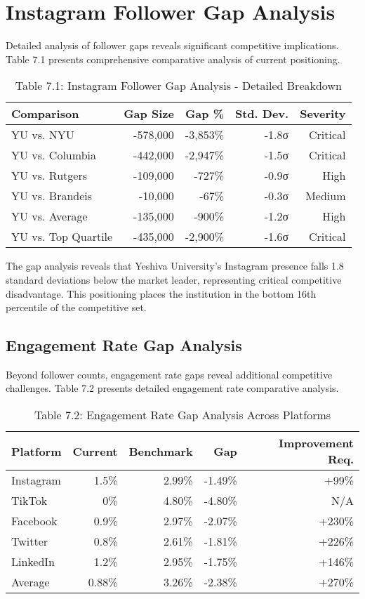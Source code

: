 \documentclass[12pt]{report}
\begin{document}
\section{Instagram Follower Gap Analysis}

Detailed analysis of follower gaps reveals significant competitive implications. Table 7.1 presents comprehensive comparative analysis of current positioning.

\begin{table}[h]
\centering
\caption{Table 7.1: Instagram Follower Gap Analysis - Detailed Breakdown}
\begin{tabular}{@{}lrrrr@{}}
\toprule
\textbf{Comparison} & \textbf{Gap Size} & \textbf{Gap \%} & \textbf{Std. Dev.} & \textbf{Severity} \\
\midrule
YU vs. NYU & -578,000 & -3,853\% & -1.8σ & Critical \\
YU vs. Columbia & -442,000 & -2,947\% & -1.5σ & Critical \\
YU vs. Rutgers & -109,000 & -727\% & -0.9σ & High \\
YU vs. Brandeis & -10,000 & -67\% & -0.3σ & Medium \\
YU vs. Average & -135,000 & -900\% & -1.2σ & High \\
YU vs. Top Quartile & -435,000 & -2,900\% & -1.6σ & Critical \\
\bottomrule
\end{tabular}
\end{table}

The gap analysis reveals that Yeshiva University's Instagram presence falls 1.8 standard deviations below the market leader, representing critical competitive disadvantage. This positioning places the institution in the bottom 16th percentile of the competitive set.

\subsection{Engagement Rate Gap Analysis}

Beyond follower counts, engagement rate gaps reveal additional competitive challenges. Table 7.2 presents detailed engagement rate comparative analysis.

\begin{table}[h]
\centering
\caption{Table 7.2: Engagement Rate Gap Analysis Across Platforms}
\begin{tabular}{@{}lrrrr@{}}
\toprule
\textbf{Platform} & \textbf{Current} & \textbf{Benchmark} & \textbf{Gap} & \textbf{Improvement Req.} \\
\midrule
Instagram & 1.5\% & 2.99\% & -1.49\% & +99\% \\
TikTok & 0\% & 4.80\% & -4.80\% & N/A \\
Facebook & 0.9\% & 2.97\% & -2.07\% & +230\% \\
Twitter & 0.8\% & 2.61\% & -1.81\% & +226\% \\
LinkedIn & 1.2\% & 2.95\% & -1.75\% & +146\% \\
Average & 0.88\% & 3.26\% & -2.38\% & +270\% \\
\bottomrule
\end{tabular}
\end{table}
\end{document}

